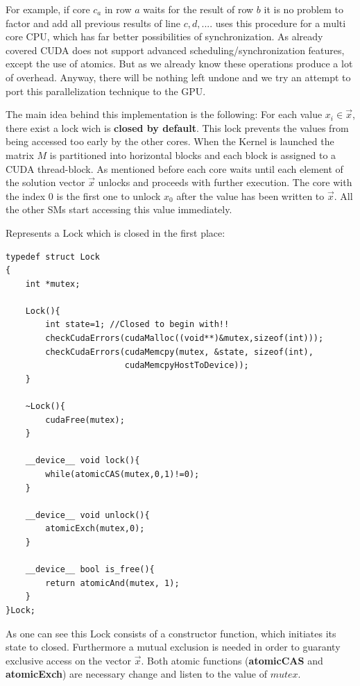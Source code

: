 \documentclass[draft, final]{vutinfth} %
\begin{document}
				For example, if core $c_{a}$ in row $a$ waits for the result of row $b$ it is no problem to factor and add all previous results of line $c, d,...$. \cite{pipelinecomp} uses this procedure for a multi core CPU, which has far better possibilities of synchronization. As already covered CUDA does not support advanced scheduling/synchronization features, except the use of atomics. But as we already know these operations produce a lot of overhead. Anyway, there will be nothing left undone and we try an attempt to port this parallelization technique to the GPU.

				The main idea behind this implementation is the following: For each value $x_i \in \vec{x}$, there exist a lock wich is \textbf{closed by default}. This lock prevents the values from being accessed too early by the other cores. When the Kernel is launched the matrix $M$ is partitioned into horizontal blocks and each block is assigned to a CUDA thread-block. As mentioned before each core waits until each element of the solution vector $\vec{x}$ unlocks and proceeds with further execution. The core with the index 0 is the first one to unlock $x_0$ after the value has been written to $\vec{x}$. All the other SMs start accessing this value immediately.

				Represents a Lock which is closed in the first place:
				\begin{lstlisting}
typedef struct Lock
{
	int	*mutex;

	Lock(){
		int state=1; //Closed to begin with!!
		checkCudaErrors(cudaMalloc((void**)&mutex,sizeof(int)));
		checkCudaErrors(cudaMemcpy(mutex, &state, sizeof(int),
						cudaMemcpyHostToDevice));
	}

	~Lock(){
		cudaFree(mutex);
	}

	__device__ void lock(){
		while(atomicCAS(mutex,0,1)!=0);
	}

	__device__ void unlock(){
		atomicExch(mutex,0);
	}

	__device__ bool is_free(){
		return atomicAnd(mutex, 1);
	}
}Lock;
				\end{lstlisting}
				As one can see this Lock consists of a constructor function, which initiates its state to closed. Furthermore a mutual exclusion is needed in order to guaranty exclusive access on the vector $\vec{x}$.
				Both atomic functions (\textbf{atomicCAS} and \textbf{atomicExch}) are necessary change and listen to the value of $mutex$.
\end{document}
